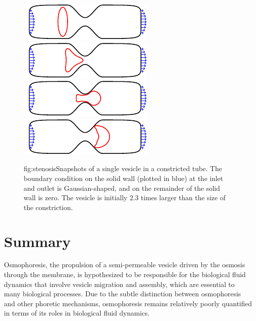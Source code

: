 \documentclass[11pt]{article}
\begin{document}
\begin{figure}
  \centering
  \includegraphics{figs/stenosisSnapsTime1.pdf}
  \includegraphics{figs/stenosisSnapsTime2.pdf}
  \includegraphics{figs/stenosisSnapsTime3.pdf}
  \includegraphics{figs/stenosisSnapsTime4.pdf}
  \caption{{fig:stenosis}Snapshots of a single vesicle in a constricted
  tube.  The boundary condition on the solid wall (plotted in blue) at
  the inlet and outlet is Gaussian-shaped, and on the remainder of the
  solid wall is zero.  The vesicle is initially $2.3$ times larger than
  the size of the constriction.}
\end{figure}


\section{Summary}
\label{sec:summary}
Osmophoresis, the propulsion of a semi-permeable vesicle driven by the
osmosis through the membrane, is hypothesized to be responsible for the
biological fluid dynamics that involve vesicle migration and assembly,
which are essential to many biological processes.  Due to the subtle
distinction between osmophoresis and other phoretic mechanisms,
osmophoresis remains relatively poorly quantified in terms of its roles
in biological fluid dynamics. 
\end{document}
